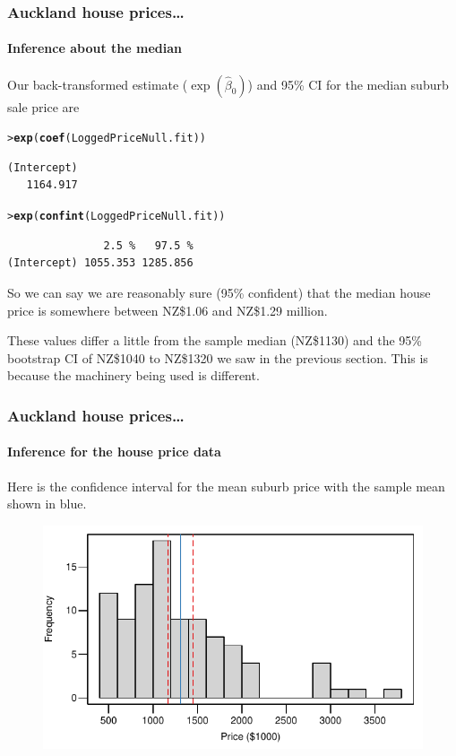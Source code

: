 \documentclass{beamer}\usepackage[]{graphicx}\usepackage[]{xcolor}
\makeatletter
\newcommand{\hlstd}[1]{\textcolor[rgb]{0.345,0.345,0.345}{#1}}%
\newcommand{\hlkwd}[1]{\textcolor[rgb]{0.737,0.353,0.396}{\textbf{#1}}}%
\newenvironment{kframe}{%
 \def\at@end@of@kframe{}%
 \ifinner\ifhmode%
  \def\at@end@of@kframe{\end{minipage}}%
  \begin{minipage}{\columnwidth}%
 \fi\fi%
 \def\FrameCommand##1{\hskip\@totalleftmargin \hskip-\fboxsep
 \colorbox{shadecolor}{##1}\hskip-\fboxsep
     \hskip-\linewidth \hskip-\@totalleftmargin \hskip\columnwidth}%
 \MakeFramed {\advance\hsize-\width
   \@totalleftmargin\z@ \linewidth\hsize
   \@setminipage}}%
 {\par\unskip\endMakeFramed%
 \at@end@of@kframe}
\newenvironment{knitrout}{}{} %
\makeatother
\begin{document}
\begin{frame}[fragile]
\frametitle{Auckland house prices\ldots}
\framesubtitle{Inference about the median}
Our back-transformed estimate ($\exp(\hat{\beta}_0)$) 
and 95\% CI for the median suburb sale price are
\begin{knitrout}\scriptsize
{}\color{fgcolor}\begin{kframe}
\begin{alltt}
\hlstd{> }\hlkwd{exp}\hlstd{(}\hlkwd{coef}\hlstd{(LoggedPriceNull.fit))}
\end{alltt}
\begin{verbatim}
(Intercept) 
   1164.917 
\end{verbatim}
\begin{alltt}
\hlstd{> }\hlkwd{exp}\hlstd{(}\hlkwd{confint}\hlstd{(LoggedPriceNull.fit))}
\end{alltt}
\begin{verbatim}
               2.5 %   97.5 %
(Intercept) 1055.353 1285.856
\end{verbatim}
\end{kframe}
\end{knitrout}

So we can say we are reasonably sure (95\% confident) that the median house price is somewhere between NZ\$1.06 and NZ\$1.29 million.
\bigskip

These values differ a little from the sample median (NZ\$1130) and the 95\% bootstrap CI
of NZ\$1040 to NZ\$1320 we saw in the previous section. 
This is because the machinery being used is different.

\bigskip

 
\bigskip

\end{frame}



\begin{frame}
\frametitle{Auckland house prices\ldots}
\framesubtitle{Inference for the house price data}

Here is the confidence interval for the mean suburb price with the sample mean shown in blue.


\begin{figure}
  \centering
  \includegraphics{figure/RC-H06-017}
\end{figure}

\end{frame}
\end{document}
